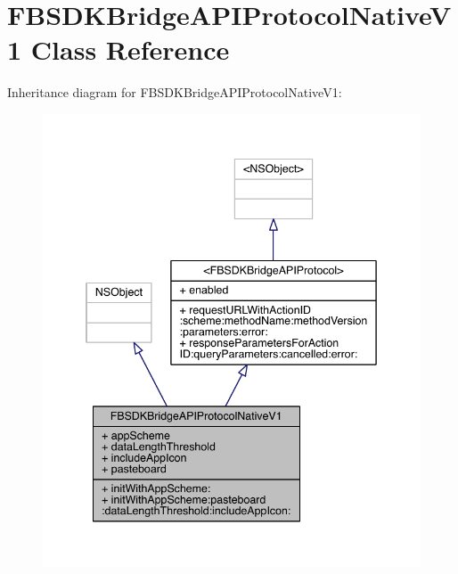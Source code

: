 \hypertarget{interface_f_b_s_d_k_bridge_a_p_i_protocol_native_v1}{\section{F\-B\-S\-D\-K\-Bridge\-A\-P\-I\-Protocol\-Native\-V1 Class Reference}
\label{interface_f_b_s_d_k_bridge_a_p_i_protocol_native_v1}
}


Inheritance diagram for F\-B\-S\-D\-K\-Bridge\-A\-P\-I\-Protocol\-Native\-V1\-:
\nopagebreak
\begin{figure}[H]
\begin{center}
\leavevmode
\includegraphics[width=342pt]{interface_f_b_s_d_k_bridge_a_p_i_protocol_native_v1__inherit__graph}
\end{center}
\end{figure}



